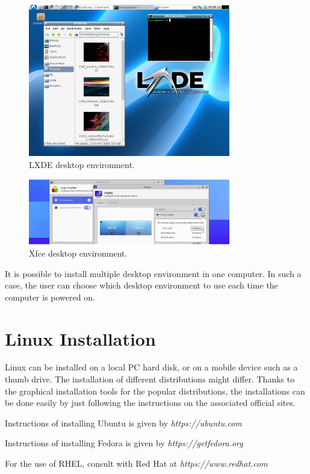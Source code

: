 \begin{figure}
	\centering
	\includegraphics[width=250pt]{chapters/ch_brief_introduction_to_linux/figures/lxde_demo.png}
	\caption{LXDE desktop environment.} \label{ch:bitl:fig:lxdedemo}
\end{figure}

\begin{figure}
	\centering
	\includegraphics[width=250pt]{chapters/ch_brief_introduction_to_linux/figures/xfce_demo.png}
	\caption{Xfce desktop environment.} \label{ch:bitl:fig:xfcedemo}
\end{figure}

It is possible to install multiple desktop environment in one computer. In such a case, the user can choose which desktop environment to use each time the computer is powered on.

\section{Linux Installation}

Linux can be installed on a local PC hard disk, or on a mobile device such as a thumb drive. The installation of different distributions might differ. Thanks to the graphical installation tools for the popular distributions, the installations can be done easily by just following the instructions on the associated official sites.

Instructions of installing Ubuntu is given by \textit{https://ubuntu.com}

Instructions of installing Fedora is given by \textit{https://getfedora.org}

For the use of RHEL, consult with Red Hat at \textit{https://www.redhat.com}
